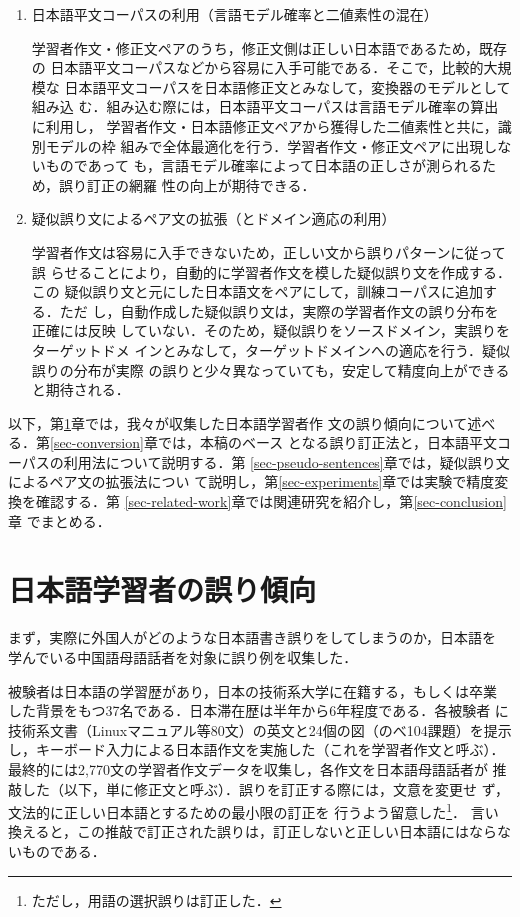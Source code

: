 \documentclass[japanese]{jnlp_1.4}
\begin{document}
\begin{enumerate}
\item 日本語平文コーパスの利用（言語モデル確率と二値素性の混在）

学習者作文・修正文ペアのうち，修正文側は正しい日本語であるため，既存の
日本語平文コーパスなどから容易に入手可能である．そこで，比較的大規模な
日本語平文コーパスを日本語修正文とみなして，変換器のモデルとして組み込
む．組み込む際には，日本語平文コーパスは言語モデル確率の算出に利用し，
学習者作文・日本語修正文ペアから獲得した二値素性と共に，識別モデルの枠
組みで全体最適化を行う．学習者作文・修正文ペアに出現しないものであって
も，言語モデル確率によって日本語の正しさが測られるため，誤り訂正の網羅
性の向上が期待できる．

\item 疑似誤り文によるペア文の拡張（とドメイン適応の利用）

学習者作文は容易に入手できないため，正しい文から誤りパターンに従って誤
らせることにより，自動的に学習者作文を模した疑似誤り文を作成する．この
疑似誤り文と元にした日本語文をペアにして，訓練コーパスに追加する．ただ
し，自動作成した疑似誤り文は，実際の学習者作文の誤り分布を正確には反映
していない．そのため，疑似誤りをソースドメイン，実誤りをターゲットドメ
インとみなして，ターゲットドメインへの適応を行う．疑似誤りの分布が実際
の誤りと少々異なっていても，安定して精度向上ができると期待される．
\end{enumerate}

以下，第\ref{sec-particle-errors}章では，我々が収集した日本語学習者作
文の誤り傾向について述べる．第\ref{sec-conversion}章では，本稿のベース
となる誤り訂正法と，日本語平文コーパスの利用法について説明する．第
\ref{sec-pseudo-sentences}章では，疑似誤り文によるペア文の拡張法につい
て説明し，第\ref{sec-experiments}章では実験で精度変換を確認する．第
\ref{sec-related-work}章では関連研究を紹介し，第\ref{sec-conclusion}章
でまとめる．



\section{日本語学習者の誤り傾向}
\label{sec-particle-errors}

まず，実際に外国人がどのような日本語書き誤りをしてしまうのか，日本語を
学んでいる中国語母語話者を対象に誤り例を収集した．

被験者は日本語の学習歴があり，日本の技術系大学に在籍する，もしくは卒業
した背景をもつ37名である．日本滞在歴は半年から6年程度である．各被験者
に技術系文書（Linuxマニュアル等80文）の英文と24個の図（のべ104課題）を提示
し，キーボード入力による日本語作文を実施した（これを学習者作文と呼ぶ）．
最終的には2,770文の学習者作文データを収集し，各作文を日本語母語話者が
推敲した（以下，単に修正文と呼ぶ）．誤りを訂正する際には，文意を変更せ
ず，文法的に正しい日本語とするための最小限の訂正を
行うよう留意した\footnote{ただし，用語の選択誤りは訂正した．}．
言い換えると，この推敲で訂正された誤りは，訂正しないと正しい日本語にはならないものである．
\end{document}
